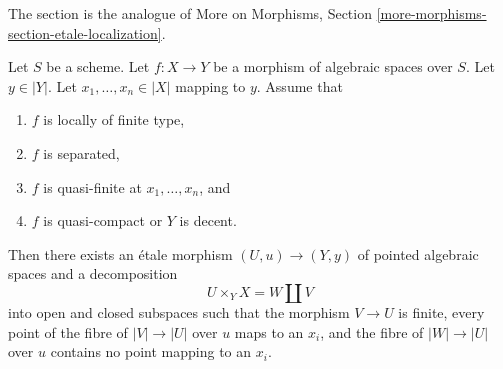 \noindent
The section is the analogue of
More on Morphisms, Section \ref{more-morphisms-section-etale-localization}.

\begin{lemma}
\label{lemma-etale-splits-off-quasi-finite-part}
Let $S$ be a scheme.
Let $f : X \to Y$ be a morphism of algebraic spaces over $S$.
Let $y \in |Y|$. Let $x_1, \ldots, x_n \in |X|$ mapping to $y$.
Assume that
\begin{enumerate}
\item $f$ is locally of finite type,
\item $f$ is separated,
\item $f$ is quasi-finite at $x_1, \ldots, x_n$, and
\item $f$ is quasi-compact or $Y$ is decent.
\end{enumerate}
Then there exists an \'etale morphism $(U, u) \to (Y, y)$
of pointed algebraic spaces and a decomposition
$$
U \times_Y X = W \amalg V
$$
into open and closed subspaces such that the morphism $V \to U$ is finite,
every point of the fibre of $|V| \to |U|$ over $u$ maps to an $x_i$,
and the fibre of $|W| \to |U|$ over $u$ contains no point mapping to an
$x_i$.
\end{lemma}

